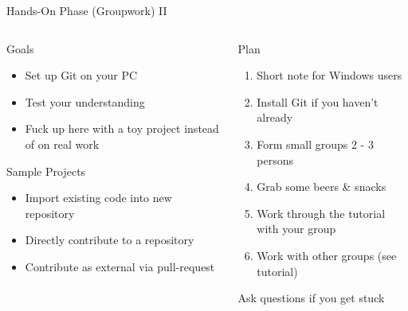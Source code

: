 \documentclass[xetex]{beamer}
\begin{document}
\begin{frame}{Hands-On Phase (Groupwork) II}
  \begin{columns}
    \begin{column}{.5\linewidth}
      \begin{alertblock}{Goals}
        \begin{itemize}
          \item Set up Git on your PC
          \item Test your understanding
          \item Fuck up here with a toy project instead of on real work
        \end{itemize}
      \end{alertblock}
      \begin{exampleblock}{Sample Projects}
        \begin{itemize}
          \item Import existing code into new repository
          \item Directly contribute to a repository
          \item Contribute as external via pull-request
        \end{itemize}
      \end{exampleblock}
    \end{column}
    \begin{column}{.5\linewidth}
      \begin{block}{Plan}
        \begin{enumerate}
          \item Short note for Windows users
          \item Install Git if you haven't already
          \item Form small groups 2 - 3 persons
          \item Grab some beers \& snacks
          \item Work through the tutorial with your group
          \item Work with other groups (see tutorial)
        \end{enumerate}
        Ask questions if you get stuck
      \end{block}
    \end{column}
  \end{columns}
\end{frame}
\end{document}
